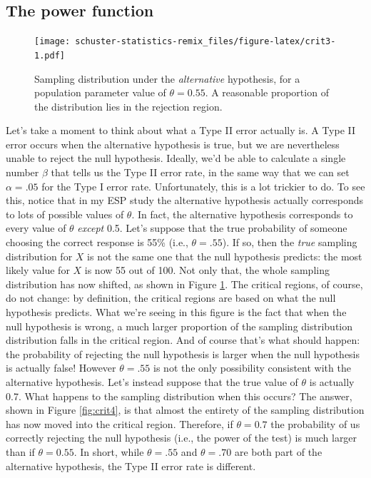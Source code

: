 \documentclass[
]{book}
\begin{document}
\hypertarget{the-power-function}{%
\subsection{The power function}\label{the-power-function}}

\begin{figure}
\centering
\texttt{[image: schuster-statistics-remix\_files/figure-latex/crit3-1.pdf]}
\caption{\label{fig:crit3}Sampling distribution under the \emph{alternative} hypothesis, for a population parameter value of \(\theta = 0.55\). A reasonable proportion of the distribution lies in the rejection region.}
\end{figure}

Let's take a moment to think about what a Type II error actually is. A Type II error occurs when the alternative hypothesis is true, but we are nevertheless unable to reject the null hypothesis. Ideally, we'd be able to calculate a single number \(\beta\) that tells us the Type II error rate, in the same way that we can set \(\alpha = .05\) for the Type I error rate. Unfortunately, this is a lot trickier to do. To see this, notice that in my ESP study the alternative hypothesis actually corresponds to lots of possible values of \(\theta\). In fact, the alternative hypothesis corresponds to every value of \(\theta\) \emph{except} 0.5. Let's suppose that the true probability of someone choosing the correct response is 55\% (i.e., \(\theta = .55\)). If so, then the \emph{true} sampling distribution for \(X\) is not the same one that the null hypothesis predicts: the most likely value for \(X\) is now 55 out of 100. Not only that, the whole sampling distribution has now shifted, as shown in Figure \ref{fig:crit3}. The critical regions, of course, do not change: by definition, the critical regions are based on what the null hypothesis predicts. What we're seeing in this figure is the fact that when the null hypothesis is wrong, a much larger proportion of the sampling distribution distribution falls in the critical region. And of course that's what should happen: the probability of rejecting the null hypothesis is larger when the null hypothesis is actually false! However \(\theta = .55\) is not the only possibility consistent with the alternative hypothesis. Let's instead suppose that the true value of \(\theta\) is actually 0.7. What happens to the sampling distribution when this occurs? The answer, shown in Figure \ref{fig:crit4}, is that almost the entirety of the sampling distribution has now moved into the critical region. Therefore, if \(\theta = 0.7\) the probability of us correctly rejecting the null hypothesis (i.e., the power of the test) is much larger than if \(\theta = 0.55\). In short, while \(\theta = .55\) and \(\theta = .70\) are both part of the alternative hypothesis, the Type II error rate is different.
\end{document}
